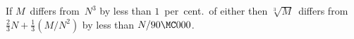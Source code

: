 If $M$~differs from~$N^{3}$ by less than $1$~per~cent.\ of either then $\sqrt[3]{M}$~differs
from $\frac{2}{3}N + \frac{1}{3}(M/N^{2})$ by less than $N/90\MC000$. 

